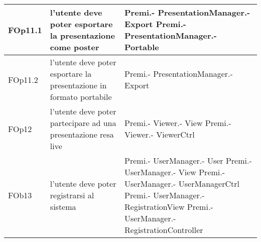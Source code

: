 \begin{longtable}{|l|p{5cm}|p{4cm}|}
\hline
FOp11.1 & l'utente deve poter esportare la presentazione come poster & Premi.- \linebreak PresentationManager.- \linebreak Export \linebreak Premi.- \linebreak PresentationManager.- \linebreak Portable \linebreak \\
\hline
FOp11.2 & l'utente deve poter esportare la presentazione in formato portabile & Premi.- \linebreak PresentationManager.- \linebreak Export \linebreak \\
\hline
FOp12 & l'utente deve poter partecipare ad una presentazione resa live & Premi.- \linebreak Viewer.- \linebreak View \linebreak Premi.- \linebreak Viewer.- \linebreak ViewerCtrl \linebreak \\
\hline
FOb13 & l'utente deve poter registrarsi al sistema & Premi.- \linebreak UserManager.- \linebreak User \linebreak Premi.- \linebreak UserManager.- \linebreak View \linebreak Premi.- \linebreak UserManager.- \linebreak UserManagerCtrl \linebreak Premi.- \linebreak UserManager.- \linebreak RegistrationView \linebreak Premi.- \linebreak UserManager.- \linebreak RegistrationController \linebreak \\
\hline

\end{longtable}
